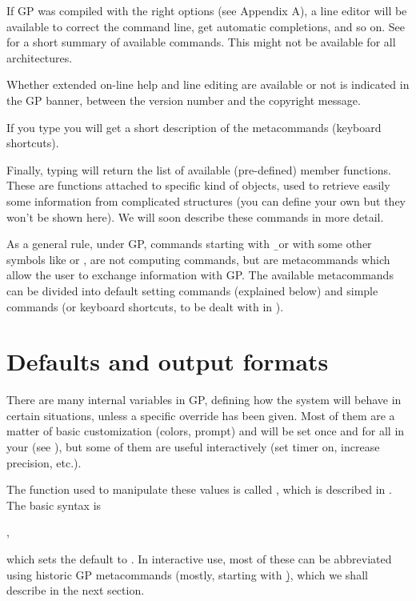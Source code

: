 If GP was compiled with the right options (see Appendix A), a line
editor will be available to correct the command line, get automatic
completions, and so on. See  for a short summary of
available commands. This might not be available for all architectures.

Whether extended on-line help and line editing are available or not is
indicated in the GP banner, between the version number and the copyright
message.

If you type  you will get a short description of the metacommands
(keyboard shortcuts).

Finally, typing  will return the list of available (pre-defined)
member functions. These are functions attached to specific kind of objects,
used to retrieve easily some information from complicated structures (you
can define your own but they won't be shown here). We will soon describe
these commands in more detail.

As a general rule, under GP, commands starting with \b\ or with some
other symbols like  or \kbd{\#}, are not computing commands, but are
metacommands which allow the user to exchange information with GP. The
available metacommands can be divided into default setting commands
(explained below) and simple commands (or keyboard shortcuts, to be dealt
with in ).

\section{Defaults and output formats}
\label{se:defaults}

\noindent
There are many internal variables in GP, defining how the system will behave
in certain situations, unless a specific override has been given. Most
of them are a matter of basic customization (colors, prompt) and will be set
once and for all in your  (see ), but
some of them are useful interactively (set timer on, increase precision,
etc.).

The function used to manipulate these values is called , which
is described in . The basic syntax is

,

\noindent
which sets the default  to . In interactive use, most
of these can be abbreviated using historic GP metacommands (mostly,
starting with \b), which we shall describe in the next section.

